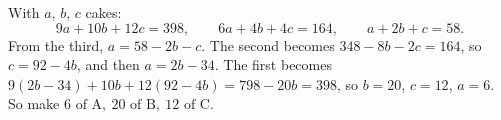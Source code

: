 With $a$, $b$, $c$ cakes:
\[9a+10b+12c=398,\qquad6a+4b+4c=164,\qquad a+2b+c=58.\]
From the third, $a=58-2b-c$. The second becomes $348-8b-2c=164$, so $c=92-4b$, and then $a=2b-34$. The first becomes $9(2b-34)+10b+12(92-4b)=798-20b=398$, so $b=20$, $c=12$, $a=6$. So make $\boxed{6\text{ of A},\ 20\text{ of B},\ 12\text{ of C}}$.
